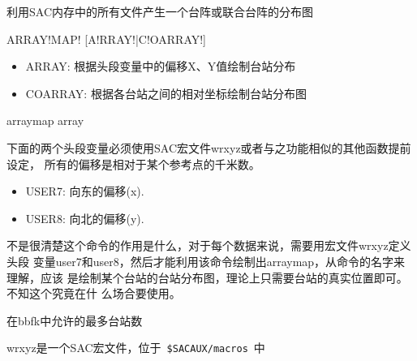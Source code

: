 \label{cmd:arraymap}

利用SAC内存中的所有文件产生一个台阵或联合台阵的分布图

\begin{SACSTX}
ARRAY!MAP! [A!RRAY!|C!OARRAY!]
\end{SACSTX}

\begin{itemize}
\item ARRAY: 根据头段变量中的偏移X、Y值绘制台站分布
\item COARRAY: 根据各台站之间的相对坐标绘制台站分布图
\end{itemize}

\begin{SACDFT}
arraymap array
\end{SACDFT}

下面的两个头段变量必须使用SAC宏文件wrxyz或者与之功能相似的其他函数提前设定，
所有的偏移是相对于某个参考点的千米数。
\begin{itemize}
\item USER7: 向东的偏移(x).
\item USER8: 向北的偏移(y).
\end{itemize}

不是很清楚这个命令的作用是什么，对于每个数据来说，需要用宏文件wrxyz定义头段
变量user7和user8，然后才能利用该命令绘制出arraymap，从命令的名字来理解，应该
是绘制某个台站的台站分布图，理论上只需要台站的真实位置即可。不知这个究竟在什
么场合要使用。

在bbfk中允许的最多台站数

wrxyz是一个SAC宏文件，位于~\lstinline{$SACAUX/macros}~中
